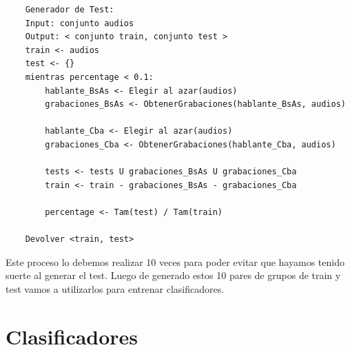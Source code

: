 \documentclass[11pt,a4paper,twoside]{tesis}
\begin{document}
\begin{lstlisting}
    Generador de Test:
    Input: conjunto audios
    Output: < conjunto train, conjunto test >
    train <- audios
    test <- {}
    mientras percentage < 0.1:
        hablante_BsAs <- Elegir al azar(audios)
        grabaciones_BsAs <- ObtenerGrabaciones(hablante_BsAs, audios)
    
        hablante_Cba <- Elegir al azar(audios)
        grabaciones_Cba <- ObtenerGrabaciones(hablante_Cba, audios)
    
        tests <- tests U grabaciones_BsAs U grabaciones_Cba
        train <- train - grabaciones_BsAs - grabaciones_Cba
    
        percentage <- Tam(test) / Tam(train) 
    
    Devolver <train, test>
\end{lstlisting}

Este proceso lo debemos realizar 10 veces para poder evitar que hayamos tenido suerte al generar el test. Luego de generado estos 10 pares de grupos de train y test vamos a utilizarlos para entrenar clasificadores.

\section{Clasificadores}
\end{document}
